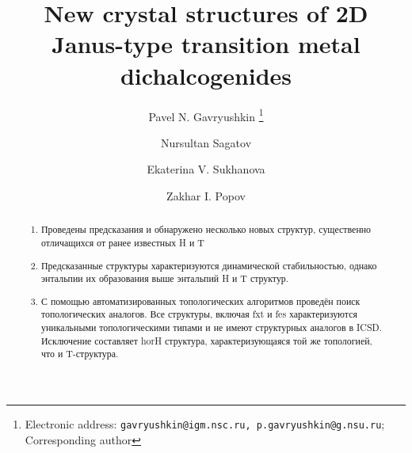 \documentclass[a4paperm]{article}
\begin{document}

\title{New crystal structures of 2D Janus-type transition metal dichalcogenides}


\author[1,2,3]{Pavel N. Gavryushkin
   \thanks{Electronic address: \texttt{gavryushkin@igm.nsc.ru, p.gavryushkin@g.nsu.ru}; Corresponding author}}     
\author[2]{Nursultan Sagatov}
\author[1]{Ekaterina V. Sukhanova}
\author[1]{Zakhar I. Popov}



\date{}
\maketitle


\begin{abstract}
\begin{enumerate}
	\item Проведены предсказания и обнаружено несколько новых структур, существенно отличащихся от ранее известных H и T 
	\item Предсказанные структуры характеризуются динамической стабильностью, однако энтальпии их образования выше энтальпий H и T структур.
	 \item С помощью автоматизированных топологических алгоритмов проведён поиск топологических аналогов. Все структуры, включая fxt и fes характеризуются уникальными топологическими типами и не имеют структурных аналогов в ICSD. Исключение составляет horH структура, характеризующаяся той же топологией, что и T-структура. 
\end{enumerate}
\end{abstract}

\end{document}
